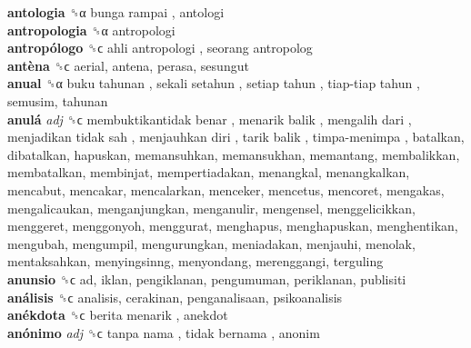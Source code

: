 \textbf{antologia} ␝α   bunga rampai , antologi  \\
\textbf{antropologia} ␝α  antropologi  \\
\textbf{antropólogo} ␝ϲ   ahli antropologi ,  seorang antropolog   \\
\textbf{antèna} ␝ϲ  aerial, antena, perasa, sesungut  \\
\textbf{anual} ␝α   buku tahunan ,  sekali setahun ,  setiap tahun ,  tiap-tiap tahun , semusim, tahunan  \\
\textbf{anulá} \emph{adj}  ␝ϲ   membuktikantidak benar ,  menarik balik ,  mengalih dari ,  menjadikan tidak sah ,  menjauhkan diri ,  tarik balik ,  timpa-menimpa , batalkan, dibatalkan, hapuskan, memansuhkan, memansukhan, memantang, membalikkan, membatalkan, membinjat, mempertiadakan, menangkal, menangkalkan, mencabut, mencakar, mencalarkan, menceker, mencetus, mencoret, mengakas, mengalicaukan, menganjungkan, menganulir, mengensel, menggelicikkan, menggeret, menggonyoh, menggurat, menghapus, menghapuskan, menghentikan, mengubah, mengumpil, mengurungkan, meniadakan, menjauhi, menolak, mentaksahkan, menyingsinng, menyondang, merenggangi, terguling  \\
\textbf{anunsio} ␝ϲ  ad, iklan, pengiklanan, pengumuman, periklanan, publisiti  \\
\textbf{análisis} ␝ϲ  analisis, cerakinan, penganalisaan, psikoanalisis  \\
\textbf{anékdota} ␝ϲ   berita menarik , anekdot  \\
\textbf{anónimo} \emph{adj}  ␝ϲ   tanpa nama ,  tidak bernama , anonim  \\
